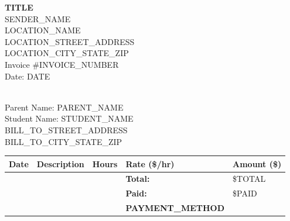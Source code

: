 \documentclass[11pt]{article}
\begin{document}
\pagestyle{empty}

\begin{center}
  {\LARGE\bf {{TITLE}}} \\
  {\large {{SENDER_NAME}}} \\
  \vspace{0.5em}
  {\large {{LOCATION_NAME}}} \\
  {\large {{LOCATION_STREET_ADDRESS}}} \\
  {\large {{LOCATION_CITY_STATE_ZIP}}} \\
  \vspace{2em}
  {\large Invoice \#{{INVOICE_NUMBER}}} \\
  {Date: {{DATE}}}
\end{center}

\vspace{1em}

 \\
Parent Name: {{PARENT_NAME}} \\
Student Name: {{STUDENT_NAME}} \\
{{BILL_TO_STREET_ADDRESS}} \\
{{BILL_TO_CITY_STATE_ZIP}} \\

\vspace{1em}

\vspace{1em}

\renewcommand{\arraystretch}{1.2}
\begin{longtable}{@{} p{3cm} p{6cm} p{2cm} p{2cm} p{2cm} @{} }
  \toprule
  \textbf{Date} & \textbf{Description} & \textbf{Hours} & \textbf{Rate (\$/hr)} & \textbf{Amount (\$)} \\
  \midrule
  \midrule
  & & & \textbf{Total:} & \${{TOTAL}} \\
  & & & \textbf{Paid:} & \${{PAID}} \\
  & & & \textbf{{{PAYMENT_METHOD}}} & \\
  \bottomrule
\end{longtable}

\vfill
\end{document}
